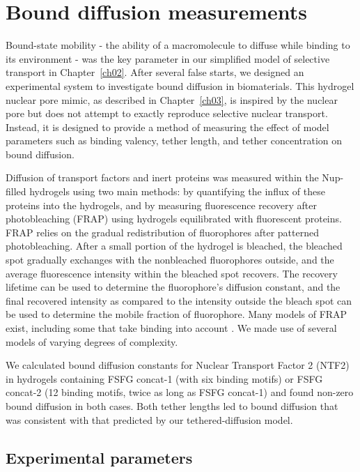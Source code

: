 \chapter{Bound diffusion measurements}\label{ch04}
\label{ch:bound-diffusion}

Bound-state mobility - the ability of a macromolecule to diffuse while binding to its environment - was the key parameter in our simplified model of selective transport in Chapter~\ref{ch02}.  After several false starts, we designed an experimental system to investigate bound diffusion in biomaterials.  This hydrogel nuclear pore mimic, as described in Chapter~\ref{ch03}, is inspired by the nuclear pore but does not attempt to exactly reproduce selective nuclear transport.  Instead, it is designed to provide a method of measuring the effect of model parameters such as binding valency, tether length, and tether concentration on bound diffusion.

Diffusion of transport factors and inert proteins was measured within the Nup-filled hydrogels using two main methods: by quantifying the influx of these proteins into the hydrogels, and by measuring fluorescence recovery after photobleaching (FRAP) using hydrogels equilibrated with fluorescent proteins.  FRAP relies on the gradual redistribution of fluorophores after patterned photobleaching.   After a small portion of the hydrogel is bleached, the bleached spot gradually exchanges with the nonbleached fluorophores outside, and the average fluorescence intensity within the bleached spot recovers.  The recovery lifetime can be used to determine the fluorophore's diffusion constant, and the final recovered intensity as compared to the intensity outside the bleach spot can be used to determine the mobile fraction of fluorophore.  Many models of FRAP exist, including some that take binding into account \cite{sprague04, wu12, kang10, kang12}. We made use of several models of varying degrees of complexity.

We calculated bound diffusion constants for Nuclear Transport Factor 2 (NTF2) in hydrogels containing FSFG concat-1 (with six binding motifs) or FSFG concat-2 (12 binding motifs, twice as long as FSFG concat-1) and found non-zero bound diffusion in both cases.  Both tether lengths led to bound diffusion that was consistent with that predicted by our tethered-diffusion model.

\section{Experimental parameters}

